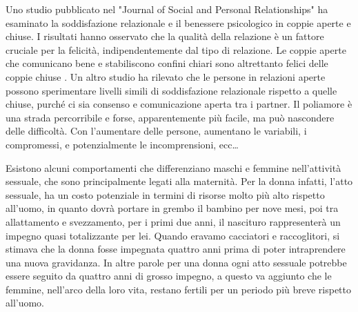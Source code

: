 \documentclass[12pt]{book} %
\begin{document}
Uno studio pubblicato nel "Journal of Social and Personal Relationships" ha esaminato la soddisfazione relazionale e il benessere psicologico in coppie aperte e chiuse. I risultati hanno osservato che la qualità della relazione è un fattore cruciale per la felicità, indipendentemente dal tipo di relazione. Le coppie aperte che comunicano bene e stabiliscono confini chiari sono altrettanto felici delle coppie chiuse .
Un altro studio ha rilevato che le persone in relazioni aperte possono sperimentare livelli simili di soddisfazione relazionale rispetto a quelle chiuse, purché ci sia consenso e comunicazione aperta tra i partner.
Il poliamore è una strada percorribile e forse, apparentemente più facile, ma può nascondere delle difficoltà. Con l'aumentare delle persone, aumentano le variabili, i compromessi, e potenzialmente le incomprensioni, ecc…

Esistono alcuni comportamenti che differenziano maschi e femmine nell'attività sessuale, che sono principalmente legati alla maternità. Per la donna infatti, l'atto sessuale, ha un costo potenziale in termini di risorse molto più alto rispetto all'uomo, in quanto dovrà portare in grembo il bambino per nove mesi, poi tra allattamento e svezzamento, per i primi due anni, il nascituro rappresenterà un impegno quasi totalizzante per lei. Quando eravamo cacciatori e raccoglitori, si stimava che la donna fosse impegnata quattro anni prima di poter intraprendere una nuova gravidanza. In altre parole per una donna ogni atto sessuale potrebbe essere seguito da quattro anni di grosso impegno, a questo va aggiunto che le femmine, nell'arco della loro vita, restano fertili per un periodo più breve rispetto all'uomo.
\end{document}
